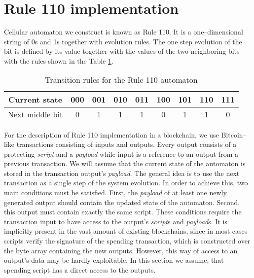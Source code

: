 \documentclass[runningheads]{llncs}
\newcommand{\payload}{\textit{payload}}
\newcommand{\script}{\textit{script}}
\begin{document}
    \section{Rule 110 implementation}
    \label{section2}
    Cellular automaton we construct is known as Rule 110.
    It is a one--dimensional string of 0s and 1s together with evolution rules.
    The one step evolution of the bit is defined by its value together with the
    values of the two neighboring bits with the rules shown in the Table
    \ref{tab:transitions}.
    \begin{table}
        \caption{Transition rules for the Rule 110 automaton}
        \label{tab:transitions}
        \centering
        \begin{tabular} {| *{9}{c|} }
            \hline
            Current state & 000 & 001 & 010 & 011 & 100 & 101 & 110 & 111 \\ \hline
            Next middle bit & 0 & 1 & 1 & 1 & 0 & 1 & 1 & 0 \\
            \hline
        \end{tabular}
    \end{table}

    For the description of Rule 110 implementation in a blockchain, we use Bitcoin--like
    transactions consisting of inputs and outputs. Every output consists of a protecting \script{}
    and a \payload{} while input is a reference to an output from a previous transaction.
    We will assume that the current state of the automaton is stored in the transaction output's \payload{}.
    The general idea is to use the next transaction as a single
    step of the system evolution. In order to achieve this, two main conditions must
    be satisfied. First, the \payload{} of at least one newly generated output should contain
    the updated state of the automaton. Second, this output must contain
    exactly the same script. These conditions require the transaction input to
    have access to the output's \script{}s and \payload{}s. It is implicitly
    present in the vast amount of existing blockchains, since in most cases
    scripts verify the signature of the spending transaction, which is
    constructed over the byte array containing the new outputs. However,
    this way of access to an output's data may be hardly exploitable. In this
    section we assume, that spending script has a direct access to the
    outputs.
\end{document}
